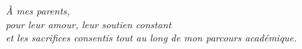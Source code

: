 \cleardoublepage
\thispagestyle{plain}

\vspace*{7cm}

\begin{flushright}
\textit{%
À mes parents,\\
pour leur amour, leur soutien constant\\
et les sacrifices consentis tout au long de mon parcours académique.
}
\end{flushright}
